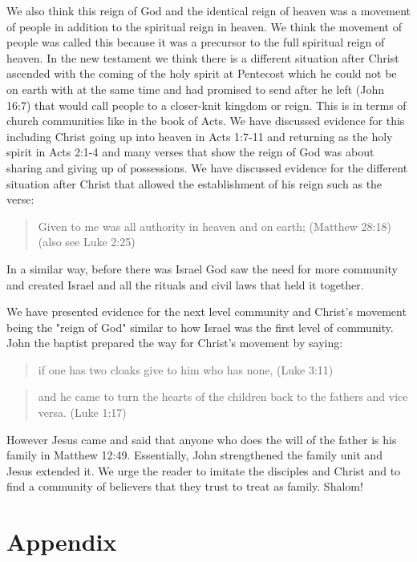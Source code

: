 \documentclass[11pt]{article}
\begin{document}
We also think this reign of God and the identical reign of heaven was a movement of people in addition to the spiritual reign in heaven. We think the movement of people was called this because it was a precursor to the full spiritual reign of heaven. In the new testament we think there is a different situation after Christ ascended with the coming of the holy spirit at Pentecost which he could not be on earth with at the same time and had promised to send after he left (John 16:7) that would call people to a closer-knit kingdom or reign. This is in terms of church communities like in the book of Acts. We have discussed evidence for this including Christ going up into heaven in Acts 1:7-11 and returning as the holy spirit in Acts 2:1-4 and many verses that show the reign of God was about sharing and giving up of possessions. We have discussed evidence for the different situation after Christ that allowed the establishment of his reign such as the verse:
\begin{quote}
Given to me was all authority in heaven and on earth; (Matthew 28:18) (also see Luke 2:25)
\end{quote}
In a similar way, before there was Israel God saw the need for more community and created Israel and all the rituals and civil laws that held it together. 

We have presented evidence for the next level community and Christ's movement being the "reign of God" similar to how Israel was the first level of community. John the baptist prepared the way for Christ's movement by saying: 
\begin{quote}
if one has two cloaks give to him who has none, (Luke 3:11) 
\end{quote}
\begin{quote}
and he came to turn the hearts of the children back to the fathers and vice versa. (Luke 1:17)
\end{quote}
However Jesus came and said that anyone who does the will of the father is his family in Matthew 12:49. Essentially, John strengthened the family unit and Jesus extended it. We urge the reader to imitate the disciples and Christ and to find a community of believers that they trust to treat as family. Shalom! 

\section{Appendix}
\end{document}
